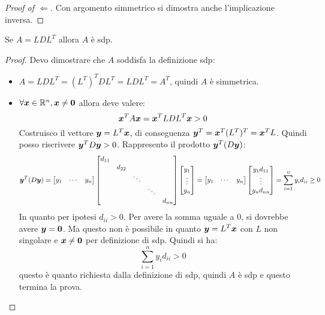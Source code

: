 \begin{proof}[Proof of $\Leftarrow$]
Con argomento simmetrico si dimostra anche l'implicazione inversa.
\end{proof}

\begin{exercise}[3.10]
Se $A = LDL^{T}$ allora $A$ \`e sdp.
\end{exercise}
\begin{proof}
Devo dimostrare che $A$ soddisfa la definizione sdp:
\begin{itemize}
\item $A = LDL^{T} = (L^{T})^{T}DL^{T} = LDL^{T} = A^{T}$, quindi $A$ \`e
simmetrica.
\item $\forall \boldsymbol{x} \in \mathbb{R}^{n}, \boldsymbol{x} \not = \boldsymbol{0}$ allora
deve valere:
\begin{displaymath}
\boldsymbol{x}^{T}A\boldsymbol{x} = \boldsymbol{x}^{T}LDL^{T}\boldsymbol{x} > 0
\end{displaymath}
Costruisco il vettore $\boldsymbol{y} = L^{T}\boldsymbol{x}$, di conseguenza $\boldsymbol{y}^{T}
= \boldsymbol{x}^{T}(L^{T})^{T} = \boldsymbol{x}^{T}L$. Quindi posso riscrivere
$\boldsymbol{y}^{T}D\boldsymbol{y} > 0$. Rappresento il prodotto $\boldsymbol{y}^{T}(D\boldsymbol{y})$:
\begin{displaymath}
\boldsymbol{y}^{T}(D\boldsymbol{y}) = 
\begin{bmatrix}
y_{1} & \cdots & y_{n}
\end{bmatrix}
\begin{bmatrix}
d_{11} \\
 & d_{22} \\
 & 		& \ddots \\
 & 		&		& \ddots\\
 &  	&  		&		& d_{nn}
\end{bmatrix}
\begin{bmatrix}
y_{1}\\
\vdots \\
y_{n}
\end{bmatrix} = 
\begin{bmatrix}
y_{1} & \cdots & y_{n}
\end{bmatrix}
\begin{bmatrix}
y_{1}d_{11}\\
\vdots \\
y_{n}d_{nn}
\end{bmatrix} =
\sum_{i = 1}^{n}{y_{i}d_{ii}} \geq 0
\end{displaymath} 
In quanto per ipotesi $d_{ii} > 0$. Per avere la somma uguale a 0, si dovrebbe
avere $\boldsymbol{y} = \boldsymbol{0}$. Ma questo non \`e possibile in quanto $\boldsymbol{y}  
= L^{T}\boldsymbol{x}$ con $L$ non singolare e $\boldsymbol{x} \not = \boldsymbol{0}$ per
definizione di sdp. Quindi si ha:
\begin{displaymath}
\sum_{i = 1}^{n}{y_{i}d_{ii}} > 0
\end{displaymath} 
questo \`e quanto richiesta dalla definizione di sdp, quindi $A$ \`e sdp e
questo termina la prova.
\end{itemize}
\end{proof}
